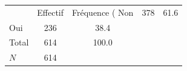 {
\def\sym#1{\ifmmode^{#1}\else\(^{#1}\)\fi}
\begin{tabular}{l*{1}{cc}}
\toprule
            &    Effectif&Fréquence (%
\midrule
Non         &         378&        61.6\\
Oui         &         236&        38.4\\
Total       &         614&       100.0\\
\midrule
\(N\)       &         614&            \\
\bottomrule
\end{tabular}
}
